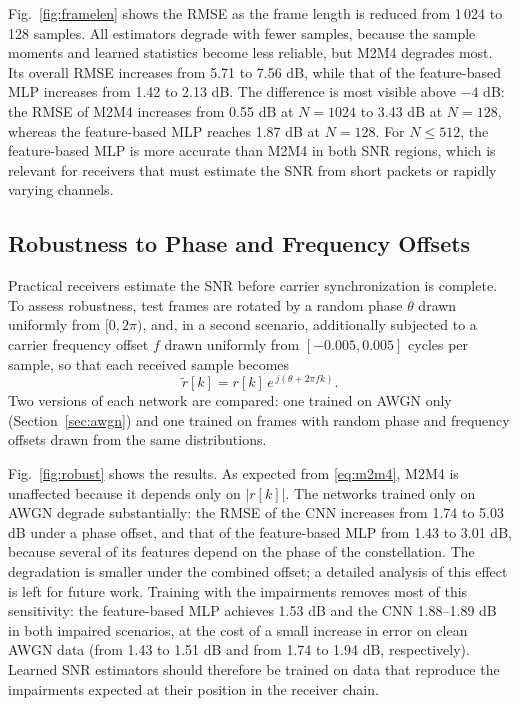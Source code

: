 \documentclass[conference]{IEEEtran}
\begin{document}
Fig.~\ref{fig:framelen} shows the RMSE as the frame length is reduced from 1\,024 to 128 samples. All estimators degrade with fewer samples, because the sample moments and learned statistics become less reliable, but M2M4 degrades most. Its overall RMSE increases from 5.71 to 7.56 dB, while that of the feature-based MLP increases from 1.42 to 2.13 dB. The difference is most visible above $-4$ dB: the RMSE of M2M4 increases from 0.55 dB at $N = 1024$ to 3.43 dB at $N = 128$, whereas the feature-based MLP reaches 1.87 dB at $N = 128$. For $N \leq 512$, the feature-based MLP is more accurate than M2M4 in both SNR regions, which is relevant for receivers that must estimate the SNR from short packets or rapidly varying channels.

\subsection{Robustness to Phase and Frequency Offsets}

Practical receivers estimate the SNR before carrier synchronization is complete. To assess robustness, test frames are rotated by a random phase $\theta$ drawn uniformly from $[0, 2\pi)$, and, in a second scenario, additionally subjected to a carrier frequency offset $f$ drawn uniformly from $[-0.005, 0.005]$ cycles per sample, so that each received sample becomes
\begin{equation}
\tilde{r}[k] = r[k]\, e^{\,j(\theta + 2\pi f k)}.
\label{eq:impair}
\end{equation} Two versions of each network are compared: one trained on AWGN only (Section~\ref{sec:awgn}) and one trained on frames with random phase and frequency offsets drawn from the same distributions.

Fig.~\ref{fig:robust} shows the results. As expected from \eqref{eq:m2m4}, M2M4 is unaffected because it depends only on $|r[k]|$. The networks trained only on AWGN degrade substantially: the RMSE of the CNN increases from 1.74 to 5.03 dB under a phase offset, and that of the feature-based MLP from 1.43 to 3.01 dB, because several of its features depend on the phase of the constellation. The degradation is smaller under the combined offset; a detailed analysis of this effect is left for future work. Training with the impairments removes most of this sensitivity: the feature-based MLP achieves 1.53 dB and the CNN 1.88--1.89 dB in both impaired scenarios, at the cost of a small increase in error on clean AWGN data (from 1.43 to 1.51 dB and from 1.74 to 1.94 dB, respectively). Learned SNR estimators should therefore be trained on data that reproduce the impairments expected at their position in the receiver chain.
\end{document}
